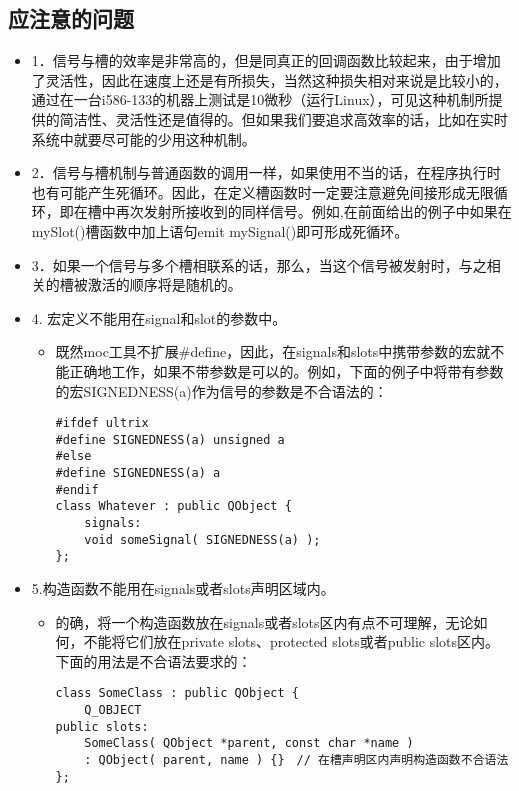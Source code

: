 \documentclass[9pt,b5paper]{article}
\begin{document}
\subsection{应注意的问题}
\label{sec-1-7}
\begin{itemize}
\item 1．信号与槽的效率是非常高的，但是同真正的回调函数比较起来，由于增加了灵活性，因此在速度上还是有所损失，当然这种损失相对来说是比较小的，通过在一台i586-133的机器上测试是10微秒（运行Linux），可见这种机制所提供的简洁性、灵活性还是值得的。但如果我们要追求高效率的话，比如在实时系统中就要尽可能的少用这种机制。
\item 2．信号与槽机制与普通函数的调用一样，如果使用不当的话，在程序执行时也有可能产生死循环。因此，在定义槽函数时一定要注意避免间接形成无限循环，即在槽中再次发射所接收到的同样信号。例如,在前面给出的例子中如果在mySlot()槽函数中加上语句emit mySignal()即可形成死循环。
\item 3．如果一个信号与多个槽相联系的话，那么，当这个信号被发射时，与之相关的槽被激活的顺序将是随机的。
\item 4. 宏定义不能用在signal和slot的参数中。
\begin{itemize}
\item 既然moc工具不扩展\#define，因此，在signals和slots中携带参数的宏就不能正确地工作，如果不带参数是可以的。例如，下面的例子中将带有参数的宏SIGNEDNESS(a)作为信号的参数是不合语法的：
\lstset{language=java,label= ,caption= ,numbers=none}
\begin{lstlisting}
#ifdef ultrix  
#define SIGNEDNESS(a) unsigned a  
#else  
#define SIGNEDNESS(a) a  
#endif  
class Whatever : public QObject {  
    signals:  
    void someSignal( SIGNEDNESS(a) );  
};
\end{lstlisting}
\end{itemize}
\item 5.构造函数不能用在signals或者slots声明区域内。
\begin{itemize}
\item 的确，将一个构造函数放在signals或者slots区内有点不可理解，无论如何，不能将它们放在private slots、protected slots或者public slots区内。下面的用法是不合语法要求的：
\lstset{language=java,label= ,caption= ,numbers=none}
\begin{lstlisting}
class SomeClass : public QObject {  
    Q_OBJECT  
public slots:  
    SomeClass( QObject *parent, const char *name )  
	: QObject( parent, name ) {}　// 在槽声明区内声明构造函数不合语法  
};
\end{lstlisting}
\end{itemize}

\end{itemize}
\end{document}
